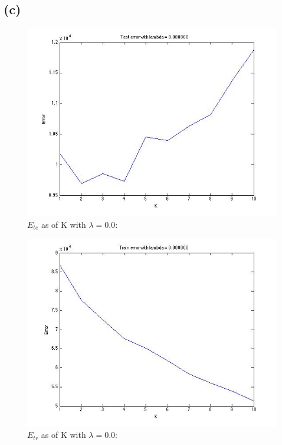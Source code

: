 \documentclass{article}
\begin{document}
\subsection{(c)}
\begin{figure}[H]
\centering
\includegraphics[scale=0.5]{TestErrorLambda0.jpg}
\caption{ $E_{te}$ as of K with $\lambda=0.0$:}
\label{}
\end{figure}

\begin{figure}[H]
\centering
\includegraphics[scale=0.5]{TrainErrorLambda0.jpg}
\caption{ $E_{tr}$ as of K with $\lambda=0.0$:}
\label{}
\end{figure}
\end{document}
